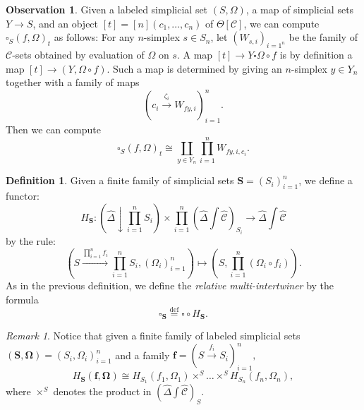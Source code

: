 \documentclass[a4paper]{article}
\numberwithin{equation}{subsection}
\theoremstyle{plain}   %
\theoremstyle{definition}
\newtheorem{defn}[equation]{Definition}
\newtheorem{obs}[equation]{Observation}
\theoremstyle{remark}
\newtheorem{rem}[equation]{Remark}
\theoremstyle{plain}
\newcommand{\overcat}[2]{{\left(#1\downarrow #2\right)}}
\newcommand{\psh}[1]{\ensuremath{\widehat{#1}}}
\providecommand{\C}{}
\renewcommand{\C}{\ensuremath{\mathcal{C}}}
\newcommand{\defeq}{\overset{\mathrm{def}}=}
\newcommand{\ssetlab}{\ensuremath{\widehat{\Delta} \int \widehat{\mathcal{C}}}}
\begin{document}
\begin{obs}\label{evaluationsquare}
	Given a labeled simplicial set \((S,\Omega)\), a map of simplicial sets \(Y\to S\), and an object \([t]=[n](c_1,\dots,c_n)\) of \(\Theta[\C]\), we can compute \(\square_S(f,\Omega)_t\) as follows: For any \(n\)-simplex \(s\in S_n\), let \((W_{s,i})_{i=1^n}\) be the family of \(\C\)-sets obtained by evaluation of \(\Omega\) on \(s\). A map \([t] \to Y\square \Omega\circ f\) is by definition a map \([t]\to (Y,\Omega\circ f)\).  Such a map is determined by giving an \(n\)-simplex \(y\in Y_n\) together with a family of maps 
	\[(c_i \xrightarrow{\zeta_i} W_{fy,i})_{i=1}^n.\] Then we can compute 
	\[\square_S(f,\Omega)_t\cong \coprod_{y\in Y_n} \prod_{i=1}^n W_{fy,i,c_i}.\]
\end{obs}

\begin{defn}\label{productintertwiner}
	Given a finite family of simplicial sets \(\mathbf{S}=(S_i)_{i=1}^n\), we define a functor:
	\[H_{\mathbf{S}}: \overcat{\psh{\Delta}}{\prod_{i=1}^n S_i} \times  \prod_{i=1}^n\left(\ssetlab\right)_{S_i} \to \ssetlab\] by the rule:
	\[\left(S \xrightarrow{\prod^n_{i=1} f_i} \prod_{i=1}^n S_i, (\Omega_i)_{i=1}^n\right)\mapsto \left(S,\prod_{i=1}^n (\Omega_i\circ f_i)\right).\]
	As in the previous definition, we define the \emph{relative multi-intertwiner} by the formula
	\[\square_{\mathbf{S}} \defeq \square \circ H_\mathbf{S}.\]
\end{defn}

\begin{rem} 
	Notice that given a finite family of labeled simplicial sets \((\mathbf{S},\mathbf{\Omega})=(S_i,\Omega_i)_{i=1}^n\) and a family \(\mathbf{f}=\left(S\xrightarrow{f_i} S_i\right)^n_{i=1},\) 
	\[
		H_{\mathbf{S}}(\mathbf{f},\mathbf{\Omega})\cong H_{S_1}(f_1, \Omega_1) \times^S \dots \times^S H_{S_n}(f_n,\Omega_n),
	\]
	where \(\times^S\) denotes the product in \(\left(\ssetlab\right)_S\).
\end{rem}
\end{document}
